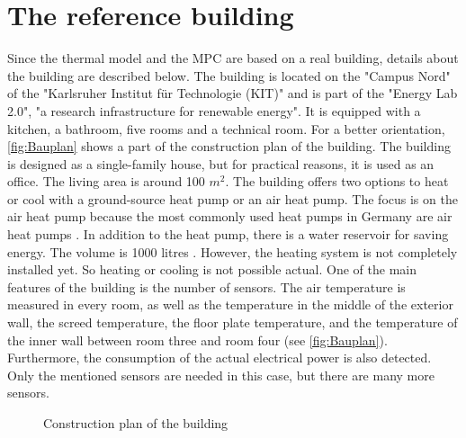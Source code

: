 \section{The reference building}
\label{section:building}
    Since the thermal model and the MPC are based on a real building, details about the building are described below.
    \newline
    The building is located on the "Campus Nord" of the "Karlsruher Institut für Technologie (KIT)" and is part of the "Energy Lab 2.0", "a research infrastructure for renewable energy"\cite{KIT.2021}. It is equipped with a kitchen, a bathroom, five rooms and a technical room. For a better orientation, \autoref{fig:Bauplan} shows a part of the construction plan of the building. The building is designed as a single-family house, but for practical reasons, it is used as an office. The living area is around 100 $m^2$. The building offers two options to heat or cool with a ground-source heat pump or an air heat pump. The focus is on the air heat pump because the most commonly used heat pumps in Germany are air heat pumps \cite{bwp.2021}. In addition to the heat pump, there is a water reservoir for saving energy. The volume is 1000 litres \cite{Oskar}. However, the heating system is not completely installed yet. So heating or cooling is not possible actual.
    \newline
    One of the main features of the building is the number of sensors. The air temperature is measured in every room, as well as the temperature in the middle of the exterior wall, the screed temperature, the floor plate temperature, and the temperature of the inner wall between room three and room four (see \autoref{fig:Bauplan}). Furthermore, the consumption of the actual electrical power is also detected. Only the mentioned sensors are needed in this case, but there are many more sensors.
    \begin{figure}
        \centering
        \def\svgwidth{320pt}
        
        \caption{Construction plan of the building \cite{Bauplan}}
        \label{fig:Bauplan}
    \end{figure}